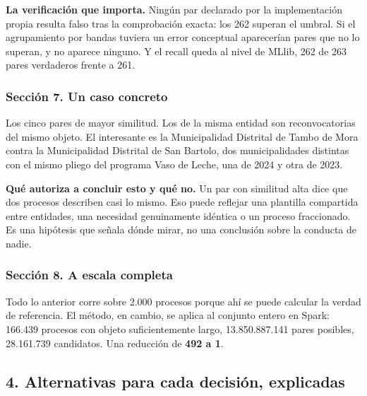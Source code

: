 \documentclass[11pt]{article}
\begin{document}
\textbf{La verificación que importa.} Ningún par declarado por la implementación propia resulta falso tras la comprobación exacta: los 262 superan el umbral. Si el agrupamiento por bandas tuviera un error conceptual aparecerían pares que no lo superan, y no aparece ninguno. Y el recall queda al nivel de MLlib, 262 de 263 pares verdaderos frente a 261.

\subsubsection*{Sección 7. Un caso concreto}
Los cinco pares de mayor similitud. Los de la misma entidad son reconvocatorias del mismo objeto. El interesante es la Municipalidad Distrital de Tambo de Mora contra la Municipalidad Distrital de San Bartolo, dos municipalidades distintas con el mismo pliego del programa Vaso de Leche, una de 2024 y otra de 2023.

\textbf{Qué autoriza a concluir esto y qué no.} Un par con similitud alta dice que dos procesos describen casi lo mismo. Eso puede reflejar una plantilla compartida entre entidades, una necesidad genuinamente idéntica o un proceso fraccionado. Es una hipótesis que señala dónde mirar, no una conclusión sobre la conducta de nadie.

\subsubsection*{Sección 8. A escala completa}
Todo lo anterior corre sobre 2.000 procesos porque ahí se puede calcular la verdad de referencia. El método, en cambio, se aplica al conjunto entero en Spark: 166.439 procesos con objeto suficientemente largo, 13.850.887.141 pares posibles, 28.161.739 candidatos. Una reducción de \textbf{492 a 1}.

\subsection*{4. Alternativas para cada decisión, explicadas}
\end{document}
